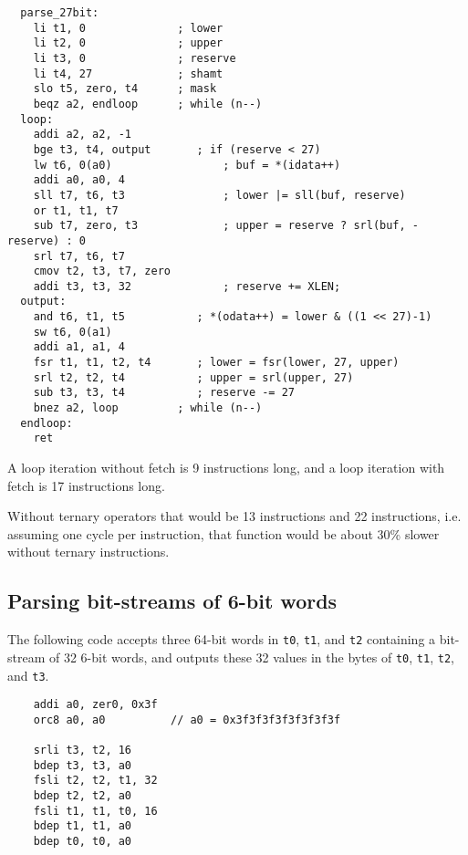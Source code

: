 \begin{minipage}{\linewidth}
\begin{verbatim}
  parse_27bit:
    li t1, 0              ; lower
    li t2, 0              ; upper
    li t3, 0              ; reserve
    li t4, 27             ; shamt
    slo t5, zero, t4      ; mask
    beqz a2, endloop      ; while (n--)
  loop:
    addi a2, a2, -1
    bge t3, t4, output       ; if (reserve < 27)
    lw t6, 0(a0)                 ; buf = *(idata++)
    addi a0, a0, 4
    sll t7, t6, t3               ; lower |= sll(buf, reserve)
    or t1, t1, t7
    sub t7, zero, t3             ; upper = reserve ? srl(buf, -reserve) : 0
    srl t7, t6, t7
    cmov t2, t3, t7, zero
    addi t3, t3, 32              ; reserve += XLEN;
  output:
    and t6, t1, t5           ; *(odata++) = lower & ((1 << 27)-1)
    sw t6, 0(a1)
    addi a1, a1, 4
    fsr t1, t1, t2, t4       ; lower = fsr(lower, 27, upper)
    srl t2, t2, t4           ; upper = srl(upper, 27)
    sub t3, t3, t4           ; reserve -= 27
    bnez a2, loop         ; while (n--)
  endloop:
    ret
\end{verbatim}
\end{minipage}

A loop iteration without fetch is 9 instructions long, and a loop iteration
with fetch is 17 instructions long.

Without ternary operators that would be 13 instructions and 22 instructions,
i.e. assuming one cycle per instruction, that function would be about 30\%
slower without ternary instructions.

\subsection{Parsing bit-streams of 6-bit words}

The following code accepts three 64-bit words in {\tt t0}, {\tt t1}, and {\tt t2}
containing a bit-stream of 32 6-bit words, and outputs these 32 values in the bytes
of {\tt t0}, {\tt t1}, {\tt t2}, and {\tt t3}.

\begin{minipage}{\linewidth}
\begin{verbatim}
    addi a0, zer0, 0x3f
    orc8 a0, a0          // a0 = 0x3f3f3f3f3f3f3f3f

    srli t3, t2, 16
    bdep t3, t3, a0
    fsli t2, t2, t1, 32
    bdep t2, t2, a0
    fsli t1, t1, t0, 16
    bdep t1, t1, a0
    bdep t0, t0, a0
\end{verbatim}
\end{minipage}

